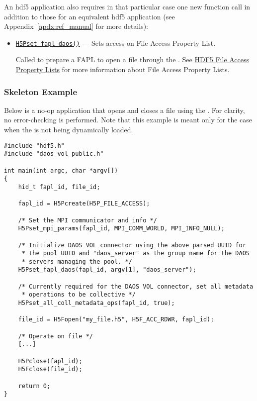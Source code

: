 \documentclass[../users_guide.tex]{subfiles}
\begin{document}
An \acrshort{hdf5} \dvc{} application also requires in that particular case one new
function call in addition to those for an equivalent \acrshort{hdf5} application (see
Appendix~\ref{apdx:ref_manual} for more details):

\begin{itemize}
 \item \texttt{\hyperref[ref:h5pset_fapl_daos]{H5Pset\_fapl\_daos()}} --- Sets \dvc{} access on File Access Property List.

    Called to prepare a FAPL to open a file through the \dvc{}. See \href{https://support.hdfgroup.org/HDF5/Tutor/property.html#fa}{HDF5 File Access Property Lists} for more information about File Access Property Lists.
\end{itemize}

\subsubsection{Skeleton Example}

Below is a no-op application that opens and closes a file using the \dvc{}.
For clarity, no error-checking is performed. Note that this example is
meant only for the case when the \dvc{} is not being dynamically loaded.

\begin{verbatim}
#include "hdf5.h"
#include "daos_vol_public.h"

int main(int argc, char *argv[])
{
    hid_t fapl_id, file_id;

    fapl_id = H5Pcreate(H5P_FILE_ACCESS);

    /* Set the MPI communicator and info */
    H5Pset_mpi_params(fapl_id, MPI_COMM_WORLD, MPI_INFO_NULL);

    /* Initialize DAOS VOL connector using the above parsed UUID for
     * the pool UUID and "daos_server" as the group name for the DAOS
     * servers managing the pool. */
    H5Pset_fapl_daos(fapl_id, argv[1], "daos_server");

    /* Currently required for the DAOS VOL connector, set all metadata
     * operations to be collective */
    H5Pset_all_coll_metadata_ops(fapl_id, true); 

    file_id = H5Fopen("my_file.h5", H5F_ACC_RDWR, fapl_id);

    /* Operate on file */
    [...]

    H5Pclose(fapl_id);
    H5Fclose(file_id);

    return 0;
}
\end{verbatim}
\end{document}
